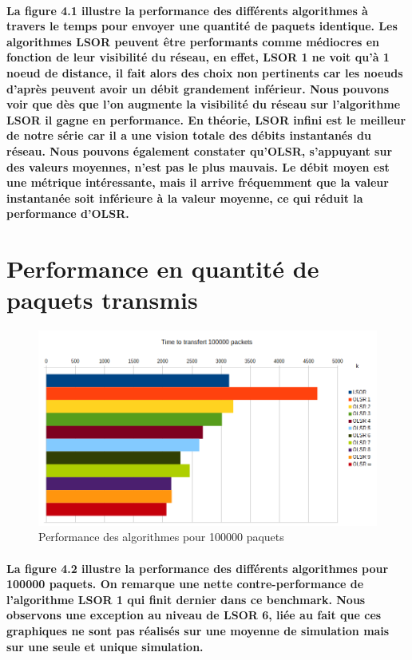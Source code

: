 \documentclass{report}
\begin{document}
\paragraph{La figure 4.1 illustre la performance des différents algorithmes à travers le temps pour envoyer une quantité de paquets identique. Les algorithmes LSOR peuvent être performants comme médiocres en fonction de leur visibilité du réseau, en effet, LSOR 1 ne voit qu'à 1 noeud de distance, il fait alors des choix non pertinents car les noeuds d'après peuvent avoir un débit grandement inférieur. Nous pouvons voir que dès que l'on augmente la visibilité du réseau sur l'algorithme LSOR il gagne en performance. En théorie, LSOR infini est le meilleur de notre série car il a une vision totale des débits instantanés du réseau. Nous pouvons également constater qu'OLSR, s'appuyant sur des valeurs moyennes, n'est pas le plus mauvais. Le débit moyen est une métrique intéressante, mais il arrive fréquemment que la valeur instantanée soit inférieure à la valeur moyenne, ce qui réduit la performance d'OLSR.}
\newpage

\section{Performance en quantité de paquets transmis}

\begin{figure}[h]
\caption{Performance des algorithmes pour 100000 paquets}
\centering
\includegraphics[scale=0.6]{quentin_result/time.png}
\end{figure}

\paragraph{La figure 4.2 illustre la performance des différents algorithmes pour 100000 paquets. On remarque une nette contre-performance de l'algorithme LSOR 1 qui finit dernier dans ce benchmark. Nous observons une exception au niveau de LSOR 6, liée au fait que ces graphiques ne sont pas réalisés sur une moyenne de simulation mais sur une seule et unique simulation.}
\newpage
\end{document}
